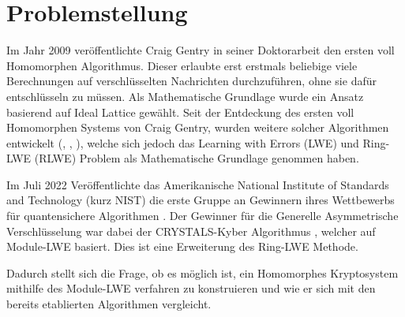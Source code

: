 \chapter{Problemstellung}
\label{Problemstellung}

Im Jahr 2009 veröffentlichte Craig Gentry in seiner Doktorarbeit \cite{Gentry2009AFH} den ersten voll Homomorphen Algorithmus. Dieser erlaubte erst erstmals beliebige viele Berechnungen auf verschlüsselten Nachrichten durchzuführen, ohne sie dafür entschlüsseln zu müssen. Als Mathematische Grundlage wurde ein Ansatz basierend auf Ideal Lattice gewählt. Seit der Entdeckung des ersten voll Homomorphen Systems von Craig Gentry, wurden weitere solcher Algorithmen entwickelt (\cite{BGV}, \cite{FV}, \cite{GSW}), welche sich jedoch das Learning with Errors (LWE) und Ring-LWE (RLWE) Problem als Mathematische Grundlage genommen haben.

Im Juli 2022 Veröffentlichte das Amerikanische National Institute of Standards and Technology (kurz NIST) die erste Gruppe an Gewinnern ihres Wettbewerbs für quantensichere Algorithmen \cite{nistAnouncement}. Der Gewinner für die Generelle Asymmetrische Verschlüsselung war dabei der CRYSTALS-Kyber Algorithmus \cite{crystalsKyberWeb}, welcher auf Module-LWE basiert. Dies ist eine Erweiterung des Ring-LWE Methode.

Dadurch stellt sich die Frage, ob es möglich ist, ein Homomorphes Kryptosystem mithilfe des Module-LWE verfahren zu konstruieren und wie er sich mit den bereits etablierten Algorithmen vergleicht.